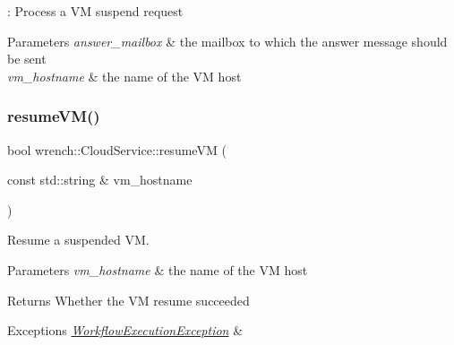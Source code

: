\+: Process a VM suspend request 


\begin{DoxyParams}{Parameters}
{\em answer\+\_\+mailbox} & the mailbox to which the answer message should be sent \\
\hline
{\em vm\+\_\+hostname} & the name of the VM host \\
\hline
\end{DoxyParams}
\mbox{\label{classwrench_1_1_cloud_service_a7f6214c3b2b017d00812bf0a425202fc}} 
\subsubsection{\texorpdfstring{resume\+V\+M()}{resumeVM()}}
{\footnotesize\ttfamily bool wrench\+::\+Cloud\+Service\+::resume\+VM (\begin{DoxyParamCaption}\item[{const std\+::string \&}]{vm\+\_\+hostname }\end{DoxyParamCaption})\hspace{0.3cm}{\ttfamily [virtual]}}



Resume a suspended VM. 


\begin{DoxyParams}{Parameters}
{\em vm\+\_\+hostname} & the name of the VM host\\
\hline
\end{DoxyParams}
\begin{DoxyReturn}{Returns}
Whether the VM resume succeeded
\end{DoxyReturn}

\begin{DoxyExceptions}{Exceptions}
{\em \hyperlink{classwrench_1_1_workflow_execution_exception}{Workflow\+Execution\+Exception}} & \\
\hline
\end{DoxyExceptions}
\mbox{\label{classwrench_1_1_cloud_service_af08b67428674be19d86a6ff5c8afcf0e}} 
